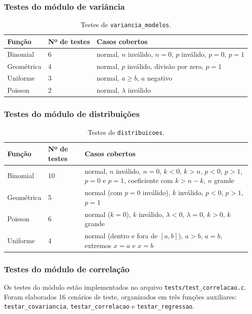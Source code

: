 \documentclass[12pt,a4paper]{article}
\newcommand{\cod}[1]{\texttt{#1}}
\begin{document}
\subsubsection{Testes do módulo de variância}
\begin{table}[h]
\centering
\small
\begin{tabular}{@{}llp{6cm}@{}}
\toprule
Função & Nº de testes & Casos cobertos \\
\midrule
Binomial   & 6 & normal, $n$ inválido, $n = 0$, $p$ inválido, $p = 0$, $p = 1$ \\
Geométrica & 4 & normal, $p$ inválido, divisão por zero, $p = 1$ \\
Uniforme   & 3 & normal, $a \ge b$, $a$ negativo \\
Poisson    & 2 & normal, $\lambda$ inválido \\
\bottomrule
\end{tabular}
\caption{Testes de \cod{variancia\_modelos}.}
\end{table}

\subsubsection{Testes do módulo de distribuições}
\begin{table}[h]
\centering
\small
\begin{tabular}{@{}llp{8cm}@{}}
\toprule
Função & Nº de testes & Casos cobertos \\
\midrule
Binomial   & 10 & normal, $n$ inválido, $n = 0$, $k < 0$, $k > n$, $p < 0$, $p > 1$, $p = 0$ e $p = 1$, coeficiente com $k > n-k$, $n$ grande \\
Geométrica & 5  & normal (com $p = 0$ inválido), $k$ inválido, $p < 0$, $p > 1$, $p = 1$ \\
Poisson    & 6  & normal ($k = 0$), $k$ inválido, $\lambda < 0$, $\lambda = 0$, $k > 0$, $k$ grande \\
Uniforme   & 4  & normal (dentro e fora de $[a,b]$), $a > b$, $a = b$, extremos $x = a$ e $x = b$ \\
\bottomrule
\end{tabular}
\caption{Testes de \cod{distribuicoes}.}
\end{table}

\subsubsection{Testes do módulo de correlação}

Os testes do módulo estão implementados no arquivo
\cod{tests/test\_correlacao.c}. Foram elaborados 16 cenários de teste,
organizados em três funções auxiliares:
\cod{testar\_covariancia}, \cod{testar\_correlacao} e
\cod{testar\_regressao}.
\end{document}
